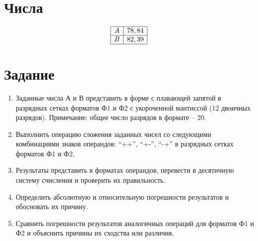 \documentclass{article}
\begin{document}
\itmo[
       variant=108,
       labn=6,
       worktype=Домашняя работа,
       discipline=Дискретная математика,
       group=P3115,
       student=Владимир Мацюк,
       teacher=Поляков Владимир Иванович,
       logo=../../../lib/img/itmo.png
]

\newcommand{\car}{\multicolumn{1}{c@{\hspace*{\tabcolsep}\makebox[0pt]{\curvearrowleft}}}{}}
\newcommand{\rcar}{\multicolumn{1}{c@{\hspace*{\tabcolsep}\makebox[0pt]{\curvearrowright}}}{}}
\newcommand{\ncar}{\multicolumn{1}{c@{\hspace*{\tabcolsep}\makebox[0pt]{}}}{}}
\newcommand{\SPACE}{\multicolumn{12}{c}{}}
\newcommand{\INT}{\multicolumn{5}{c}{\MM{Интерпретации}}}
\newcommand{\PLUS}{\multirow{2}{*}{+}}
\newcommand{\MINUS}{\multirow{2}{*}{-}}
\newcommand{\SIGN}{\multicolumn{2}{c}{\MM{Знаковая}}}
\newcommand{\USIGN}{\multicolumn{2}{c}{\MM{Беззнаковая}}}

\section{Числа}
$$
       \begin{array}{|c|c|}
              \hline
              A & 78,84 \\\hline
              B & 82,39 \\\hline
       \end{array}
$$
\section{Задание}

\begin{enumerate}
       \item Заданные числа А и В представить в форме с плавающей запятой в разрядных сетках форматов Ф1 и Ф2 с укороченной мантиссой (12 двоичных разрядов).
             Примечание: общее число разрядов в формате – 20.
       \item Выполнить операцию сложения заданных чисел со следующими комбинациями знаков операндов: “++”, “+-”, “-+” в разрядных сетках форматов Ф1 и Ф2.
       \item Результаты представить в форматах операндов, перевести в десятичную систему счисления и проверить их правильность.
       \item Определить абсолютную и относительную погрешности результатов и обосновать их причину.
       \item Сравнить погрешности результатов аналогичных операций для форматов Ф1 и Ф2 и объяснить причины их сходства или различия.
\end{enumerate}
\end{document}
